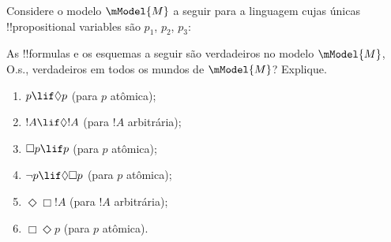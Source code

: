 \documentclass[../../../include/open-logic-section]{subfiles}
\begin{document}
\begin{prob}
  Considere o modelo $\mModel{M}$ a seguir para a linguagem cujas únicas
  !!{propositional variable}s são $p_1$, $p_2$, $p_3$:
  \begin{center}
  \end{center}
  As !!{formula}s e os esquemas a seguir são verdadeiros no modelo
  $\mModel{M}$, O.s.\@, verdadeiros em todos os mundos de $\mModel{M}$?
  Explique.
  \begin{enumerate}
  \item $p\lif \Diamond p$ (para $p$ atômica);
  \item $!A\lif \Diamond !A$ (para $!A$ arbitrária);
  \item $\Box p \lif p$ (para $p$ atômica);
  \item $\lnot p \lif \Diamond \Box p$ (para $p$ atômica);
  \item $\Diamond \Box !A$ (para $!A$ arbitrária);
  \item $\Box \Diamond p$ (para $p$ atômica). 
  \end{enumerate}
\end{prob}
\end{document}
